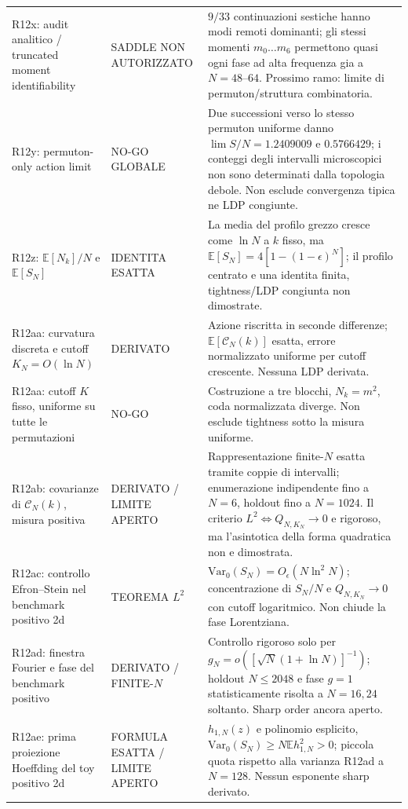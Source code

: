 \documentclass[11pt,a4paper]{article}
\newcommand{\status}[1]{\textsf{#1}}
\begin{document}
\begin{longtable}{p{}p{}p{}}
\addlinespace
R12x: audit analitico / truncated moment identifiability & \status{SADDLE NON AUTORIZZATO} & $9/33$ continuazioni sestiche hanno modi remoti dominanti; gli stessi momenti $m_0\ldots m_6$ permettono quasi ogni fase ad alta frequenza gia a $N=48$--$64$. Prossimo ramo: limite di permuton/struttura combinatoria. \\
\addlinespace
R12y: permuton-only action limit & \status{NO-GO GLOBALE} & Due successioni verso lo stesso permuton uniforme danno $\lim S/N=1.2409009$ e $0.5766429$; i conteggi degli intervalli microscopici non sono determinati dalla topologia debole. Non esclude convergenza tipica ne LDP congiunte. \\
\addlinespace
R12z: $\mathbb E[N_k]/N$ e $\mathbb E[S_N]$ & \status{IDENTITA ESATTA} & La media del profilo grezzo cresce come $\ln N$ a $k$ fisso, ma $\mathbb E[S_N]=4[1-(1-\epsilon)^N]$; il profilo centrato e una identita finita, tightness/LDP congiunta non dimostrate. \\
\addlinespace

R12aa: curvatura discreta e cutoff $K_N=O(\ln N)$ & \status{DERIVATO} & Azione riscritta in seconde differenze; $\mathbb E[\mathcal C_N(k)]$ esatta, errore normalizzato uniforme per cutoff crescente. Nessuna LDP derivata. \\
\addlinespace
R12aa: cutoff $K$ fisso, uniforme su tutte le permutazioni & \status{NO-GO} & Costruzione a tre blocchi, $N_k=m^2$, coda normalizzata diverge. Non esclude tightness sotto la misura uniforme. \\
\addlinespace
R12ab: covarianze di $\mathcal C_N(k)$, misura positiva & \status{DERIVATO / LIMITE APERTO} & Rappresentazione finite-$N$ esatta tramite coppie di intervalli; enumerazione indipendente fino a $N=6$, holdout fino a $N=1024$. Il criterio $L^2\Leftrightarrow Q_{N,K_N}\to0$ e rigoroso, ma l'asintotica della forma quadratica non e dimostrata. \\
\addlinespace
R12ac: controllo Efron--Stein nel benchmark positivo 2d & \status{TEOREMA $L^2$} & $\mathrm{Var}_0(S_N)=O_\epsilon(N\ln^2 N)$; concentrazione di $S_N/N$ e $Q_{N,K_N}\to0$ con cutoff logaritmico. Non chiude la fase Lorentziana. \\
\addlinespace
R12ad: finestra Fourier e fase del benchmark positivo & \status{DERIVATO / FINITE-$N$} & Controllo rigoroso solo per $g_N=o([\sqrt N(1+\ln N)]^{-1})$; holdout $N\le2048$ e fase $g=1$ statisticamente risolta a $N=16,24$ soltanto. Sharp order ancora aperto. \\
\addlinespace
R12ae: prima proiezione Hoeffding del toy positivo 2d & \status{FORMULA ESATTA / LIMITE APERTO} & $h_{1,N}(z)$ e polinomio esplicito, $\mathrm{Var}_0(S_N)\ge N\mathbb E h_{1,N}^2>0$; piccola quota rispetto alla varianza R12ad a $N=128$. Nessun esponente sharp derivato. \\


\end{longtable}
\end{document}
